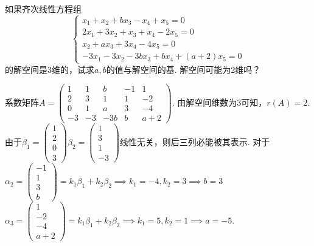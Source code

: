\begin{exercise}
\begin{exgroup}
        \item 如果齐次线性方程组\[\begin{cases}
                x_1+x_2+bx_3-x_4+x_5=0   \\
                2x_1+3x_2+x_3+x_4-2x_5=0 \\
                x_2+ax_3+3x_4-4x_5=0     \\
                -3x_1-3x_2-3bx_3+bx_4+(a+2)x_5=0
            \end{cases}\]的解空间是3维的，试求$a,b$的值与解空间的基. 解空间可能为2维吗？
        \begin{answer}
            系数矩阵$A=\begin{pmatrix}
                1  & 1  & b   & -1 & 1   \\
                2  & 3  & 1   & 1  & -2  \\
                0  & 1  & a   & 3  & -4  \\
                -3 & -3 & -3b & b  & a+2
            \end{pmatrix}$. 由解空间维数为3可知，$r(A)=2$. 由于$\beta_1=\begin{pmatrix}
                1 \\
                2 \\
                0 \\
                3
            \end{pmatrix}
            \beta_2=\begin{pmatrix}
                1 \\
                3 \\
                1 \\
                -3
            \end{pmatrix}$线性无关，则后三列必能被其表示. 对于$\alpha_2=\begin{pmatrix}
                -1 \\
                1  \\
                3  \\
                b
            \end{pmatrix}=k_1\beta_1+k_2\beta_2\implies k_1=-4,k_2=3\implies b=3$\\
        $\alpha_3=\begin{pmatrix}
                1  \\
                -2 \\
                -4 \\
                a+2
            \end{pmatrix}=k_1\beta_1+k_2\beta_2\implies k_1=5,k_2=1\implies a=-5$. \\

\end{answer}
\end{exgroup}
\end{exercise}
